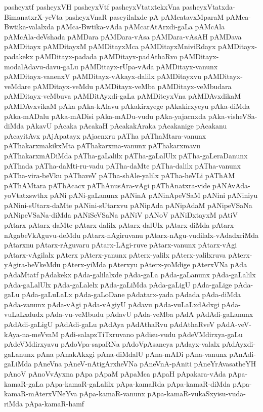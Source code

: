 {pasheyxtf
pasheyxVH
pasheyxVtf
pasheyxVtatxtekxVna
pasheyxVtatxda-BimanatxrX-yeVta
pasheyxVnaR
paseyilalxde
pA
pAMcatavxMparaM
pAMca-Bwtika-valalxda
pAMca-Bwtika-vAda
pAMcarAtArxdi-gaLa
pAMcAla
pAMcAla-deVshada
pAMDara
pAMDara-vAsa
pAMDara-vAsAH
pAMDava
pAMDitayx
pAMDitayxM
pAMDitayxMca
pAMDitayxMniviRdayx
pAMDitayx-padakekx
pAMDitayx-padada
pAMDitayx-padAthaRvo
pAMDitayx-modalAdavu-davu-gaLu
pAMDitayx-rUpa-vAda
pAMDitayx-vanunx
pAMDitayx-vanenxV
pAMDitayx-vAkayx-dalilx
pAMDitayxvu
pAMDitayx-veMdare
pAMDitayx-veMdu
pAMDitayx-veMba
pAMDitayx-veMbudara
pAMDitayx-veMbuva
pAMDitAyxdi-gaLa
pAMDiteyxVna
pAMDAvxdikaM
pAMDAvxvikaM
pAka
pAka-kAlavu
pAkakirxyege
pAkakirxyeyu
pAka-diMda
pAka-mADalu
pAka-mADisi
pAka-mADu-vudu
pAka-yajacnxda
pAka-visheVSa-diMda
pAkavU
pAcaka
pAcakaH
pAcakakAraka
pAcakanige
pAcakanu
pAcayitAvx
pAjApatayx
pAjacnxru
pATha
pAThaMtara-vanunx
pAThakarxmakikxMta
pAThakarxma-vanunx
pAThakarxmavu
pAThakarxmADiMda
pATha-gaLalilx
pATha-gaLalUlx
pATha-gaLeraDanunx
pAThada
pATha-daMti-ru-vadu
pATha-daMte
pATha-dalilx
pATha-vanunx
pATha-vira-beVku
pAThaveV
pATha-shAle-yalilx
pATha-heVLi
pAThAM
pAThAMtara
pAThAcacx
pAThAnusAra-vAgi
pAThAnatxra-vide
pANAvAda-yoVtatxswthx
pANi
pANi-gaLanunx
pANinA
pANinApeVSaM
pANini
pANiniyu
pANini-sUtarx-daMte
pANini-sUtarxvu
pANipAda
pANipAdaM
pANipeVSaNa
pANipeVSaNa-diMda
pANiSeVSaNa
pANiV
pANoV
pANiDxtayxM
pAtiV
pAtarx
pAtarx-daMte
pAtarx-dalilx
pAtarx-dalUlx
pAtarx-diMda
pAtarx-nAgabeVkAguvu-deMdu
pAtarx-nAgiruvanu
pAtarx-nAgu-vudilalx-vAdadxriMda
pAtarxnu
pAtarx-rAguvaru
pAtarx-LAgi-ruve
pAtarx-vanunx
pAtarx-vAgi
pAtarx-vAgilalx
pAterx
pAterx-yanunx
pAterx-yalilx
pAterx-yalilxruva
pAterx-yAgira-beVkeMdu
pAterx-yiMda
pAterxyu
pAterx-yoMdige
pAterxVNa
pAda
pAdaMtatf
pAdakekx
pAda-galilalxde
pAda-gaLa
pAda-gaLanunx
pAda-gaLalilx
pAda-gaLalUlx
pAda-gaLalelx
pAda-gaLiMda
pAda-gaLigU
pAda-gaLige
pAda-gaLu
pAda-gaLuLaLx
pAda-gaLoDane
pAdatarx-yada
pAdada
pAda-diMda
pAda-vanunx
pAda-vAgi
pAda-vAgiyU
pAdavu
pAda-vuLaLxdAdxgi
pAda-vuLaLxdudx
pAda-vu-veMbudu
pAdavU
pAda-veMba
pAdA
pAdAdi-gaLanunx
pAdAdi-gaLigU
pAdAdi-gaLu
pAdAya
pAdAthaRvu
pAdAthaRveV
pAdA-veV-kAya-na-meVvaM
pAdi-salapxTiTxruvano
pAdisu-vudu
pAdeVMdirxya-gaLu
pAdeVMdirxyavu
pAdoVpa-sapaRNa
pAdoVpAsaneya
pAdayx-valalx
pAdAyxdi-gaLanunx
pAna
pAnakAkxgi
pAna-diMdalU
pAna-mADi
pAna-vanunx
pAnAdi-gaLiMda
pAneVna
pAneV-nAtigArxheVNa
pAneVnA-pAniti
pAneYrAvasatheYH
pAnoV
pAnoVvAyxna
pApa
pApaM
pApaMca
pApaH
pApakara-vAda
pApa-kamaR-gaLa
pApa-kamaR-gaLalilx
pApa-kamaRda
pApa-kamaR-diMda
pApa-kamaR-mAterxVNeYva
pApa-kamaR-vanunx
pApa-kamaR-vukaSxyisu-vuda-riMda
pApa-kamaR-hamf
}
